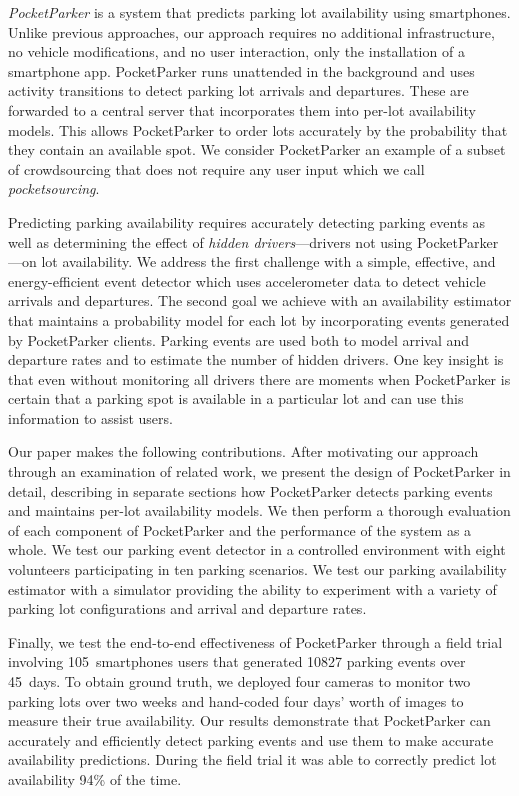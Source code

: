 \documentclass{sigchi}
\begin{document}
\textit{PocketParker} is a system that predicts parking lot availability
using smartphones. Unlike previous approaches, our approach requires no
additional infrastructure, no vehicle modifications, and no user interaction,
only the installation of a smartphone app. PocketParker runs unattended in
the background and uses activity transitions to detect parking lot arrivals
and departures. These are forwarded to a central server that incorporates
them into per-lot availability models. This allows PocketParker to order lots
accurately by the probability that they contain an available spot. We
consider PocketParker an example of a subset of crowdsourcing that does not
require any user input which we call \textit{pocketsourcing}.

Predicting parking availability requires accurately detecting parking events
as well as determining the effect of \textit{hidden drivers}---drivers not
using PocketParker---on lot availability. We address the first challenge with
a simple, effective, and energy-efficient event detector which uses
accelerometer data to detect vehicle arrivals and departures. The second goal
we achieve with an availability estimator that maintains a probability model
for each lot by incorporating events generated by PocketParker clients.
Parking events are used both to model arrival and departure rates and to
estimate the number of hidden drivers. One key insight is that even without
monitoring all drivers there are moments when PocketParker is certain that a
parking spot is available in a particular lot and can use this information to
assist users.

Our paper makes the following contributions. After motivating our approach
through an examination of related work, we present the design of PocketParker
in detail, describing in separate sections how PocketParker detects parking
events and maintains per-lot availability models. We then perform a thorough
evaluation of each component of PocketParker and the performance of the
system as a whole. We test our parking event detector in a controlled
environment with eight volunteers participating in ten parking scenarios. We
test our parking availability estimator with a simulator providing the
ability to experiment with a variety of parking lot configurations and
arrival and departure rates.

Finally, we test the end-to-end effectiveness of PocketParker through a field
trial involving 105~smartphones users that generated \num{10827} parking
events over 45~days. To obtain ground truth, we deployed four cameras to
monitor two parking lots over two weeks and hand-coded four days' worth of
images to measure their true availability. Our results demonstrate that
PocketParker can accurately and efficiently detect parking events and use
them to make accurate availability predictions. During the field trial it was
able to correctly predict lot availability 94\% of the time.
\end{document}
